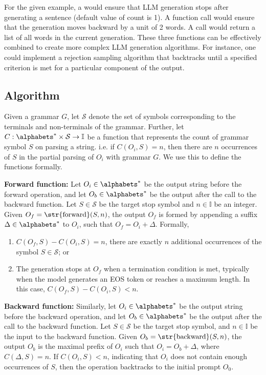 For the given example, a  would ensure that LLM generation stops after generating a sentence (default value of count is 1). 
A  function call would ensure that the generation moves backward by a unit of 2 words. 
A  call would return a list of all words in the current generation.
These three functions can be effectively combined to create more complex LLM generation algorithms. 
For instance, one could implement a rejection sampling algorithm that backtracks until a specified criterion is met for a particular component of the output. 


\subsection{\Tool{} Algorithm}

Given a grammar $G$, let $\mathcal{S}$ denote the set of symbols corresponding to the terminals and non-terminals of the grammar.
Further, let $C: \alphabets^* \times \mathcal{S} \to \mathbb{I}$ be a function that represents the count of grammar symbol $S$ on parsing a string. 
i.e. if $C(O_i, S) = n$, then there are $n$ occurrences of $S$ in the partial parsing of $O_i$ with grammar $G$.
We use this to define the \Tool{} functions formally.

\textbf{Forward function:}
Let $ O_i \in \alphabets^* $ be the output string before the forward operation, and let $O_b \in \alphabets^*$ be the output after the call to the backward function.
Let $ S \in \mathcal{S} $ be the target stop symbol and $ n \in \mathbb{I}$ be an integer.
Given $ O_f = \text{\str{forward}}(S, n) $, the output $ O_f $ is formed by appending a suffix $ \Delta \in \alphabets^* $ to $ O_i $, such that $ O_f = O_i + \Delta $. Formally,

\begin{enumerate}
    \item $ C(O_f, S) - C(O_i, S) = n $, there are exactly $ n $ additional occurrences of the symbol $ S \in \mathcal{S} $; or 
    \item The generation stops at $ O_f $ when a termination condition is met, typically when the model generates an EOS token or reaches a maximum length. In this case, $ C(O_f, S) - C(O_i, S) < n $.
\end{enumerate}

\textbf{Backward function:} Similarly, let $ O_i \in \alphabets^* $ be the output string before the backward operation, and let $ O_b \in \alphabets^* $ be the output after the call to the backward function. 
Let $ S \in \mathcal{S} $ be the target stop symbol, and $ n \in \mathbb{I} $ be the input to the backward function. 
Given $ O_b = \text{\str{backward}}(S, n) $, the output $ O_b $ is the maximal prefix of $ O_i $ such that $ O_i = O_b + \Delta $, where $ C(\Delta, S) = n $. 
If $ C(O_i, S) < n $, indicating that $ O_i $ does not contain enough occurrences of $ S $, then the operation backtracks to the initial prompt $ O_0 $.


